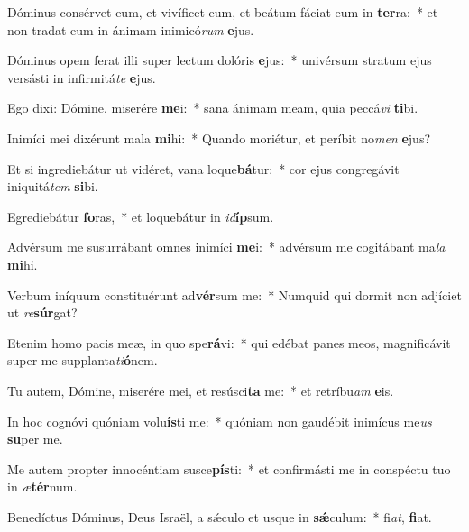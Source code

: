 \item Dóminus consérvet eum, et vivíficet eum, et beátum fáciat eum in \textbf{ter}ra:~* et non tradat eum in ánimam inimicó\textit{rum} \textbf{e}jus.
\item Dóminus opem ferat illi super lectum dolóris \textbf{e}jus:~* univérsum stratum ejus versásti in infirmitá\textit{te} \textbf{e}jus.
\item Ego dixi: Dómine, miserére \textbf{me}i:~* sana ánimam meam, quia peccá\textit{vi} \textbf{ti}bi.
\item Inimíci mei dixérunt mala \textbf{mi}hi:~* Quando moriétur, et períbit no\textit{men} \textbf{e}jus?
\item Et si ingrediebátur ut vidéret, vana loque\textbf{bá}tur:~* cor ejus congregávit iniquitá\textit{tem} \textbf{si}bi.
\item Egrediebátur \textbf{fo}ras,~* et loquebátur in \textit{id}\textbf{íp}sum.
\item Advérsum me susurrábant omnes inimíci \textbf{me}i:~* advérsum me cogitábant ma\textit{la} \textbf{mi}hi.
\item Verbum iníquum constituérunt ad\textbf{vér}sum me:~* Numquid qui dormit non adjíciet ut \textit{re}\textbf{súr}gat?
\item Etenim homo pacis meæ, in quo spe\textbf{rá}vi:~* qui edébat panes meos, magnificávit super me supplanta\textit{ti}\textbf{ó}nem.
\item Tu autem, Dómine, miserére mei, et resúsci\textbf{ta} me:~* et retríbu\textit{am} \textbf{e}is.
\item In hoc cognóvi quóniam volu\textbf{ís}ti me:~* quóniam non gaudébit inimícus me\textit{us} \textbf{su}per me.
\item Me autem propter innocéntiam susce\textbf{pís}ti:~* et confirmásti me in conspéctu tuo in \textit{æ}\textbf{tér}num.
\item Benedíctus Dóminus, Deus Israël, a sǽculo et usque in \textbf{sǽ}culum:~* fi\textit{at}, \textbf{fi}at.
